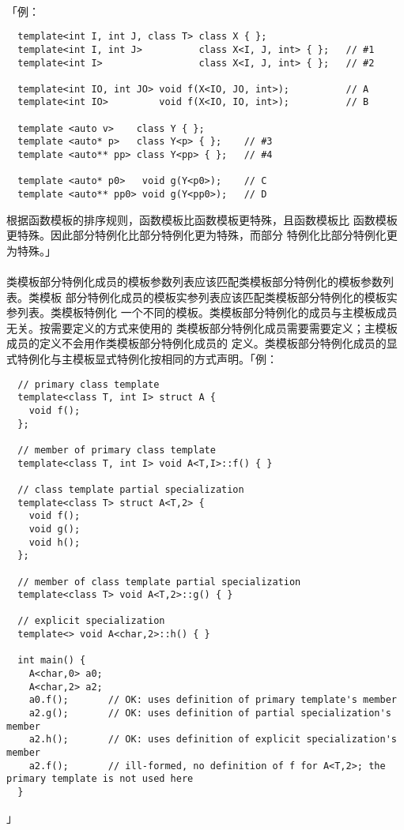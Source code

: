 \paragraph{}
「例：
\begin{lstlisting}
  template<int I, int J, class T> class X { };
  template<int I, int J>          class X<I, J, int> { };   // #1
  template<int I>                 class X<I, J, int> { };   // #2

  template<int IO, int JO> void f(X<IO, JO, int>);          // A
  template<int IO>         void f(X<IO, IO, int>);          // B

  template <auto v>    class Y { };
  template <auto* p>   class Y<p> { };    // #3
  template <auto** pp> class Y<pp> { };   // #4

  template <auto* p0>   void g(Y<p0>);    // C
  template <auto** pp0> void g(Y<pp0>);   // D
\end{lstlisting}
根据函数模板的排序规则，函数模板比函数模板更特殊，且函数模板比
函数模板更特殊。因此部分特例化比部分特例化更为特殊，而部分
特例化比部分特例化更为特殊。」

\paragraph{}
类模板部分特例化成员的模板参数列表应该匹配类模板部分特例化的模板参数列表。类模板
部分特例化成员的模板实参列表应该匹配类模板部分特例化的模板实参列表。类模板特例化
一个不同的模板。类模板部分特例化的成员与主模板成员无关。按需要定义的方式来使用的
类模板部分特例化成员需要需要定义；主模板成员的定义不会用作类模板部分特例化成员的
定义。类模板部分特例化成员的显式特例化与主模板显式特例化按相同的方式声明。「例：
\begin{lstlisting}
  // primary class template
  template<class T, int I> struct A {
    void f();
  };

  // member of primary class template
  template<class T, int I> void A<T,I>::f() { }

  // class template partial specialization
  template<class T> struct A<T,2> {
    void f();
    void g();
    void h();
  };

  // member of class template partial specialization
  template<class T> void A<T,2>::g() { }

  // explicit specialization
  template<> void A<char,2>::h() { }

  int main() {
    A<char,0> a0;
    A<char,2> a2;
    a0.f();       // OK: uses definition of primary template's member
    a2.g();       // OK: uses definition of partial specialization's member
    a2.h();       // OK: uses definition of explicit specialization's member
    a2.f();       // ill-formed, no definition of f for A<T,2>; the primary template is not used here
  }
\end{lstlisting}」

